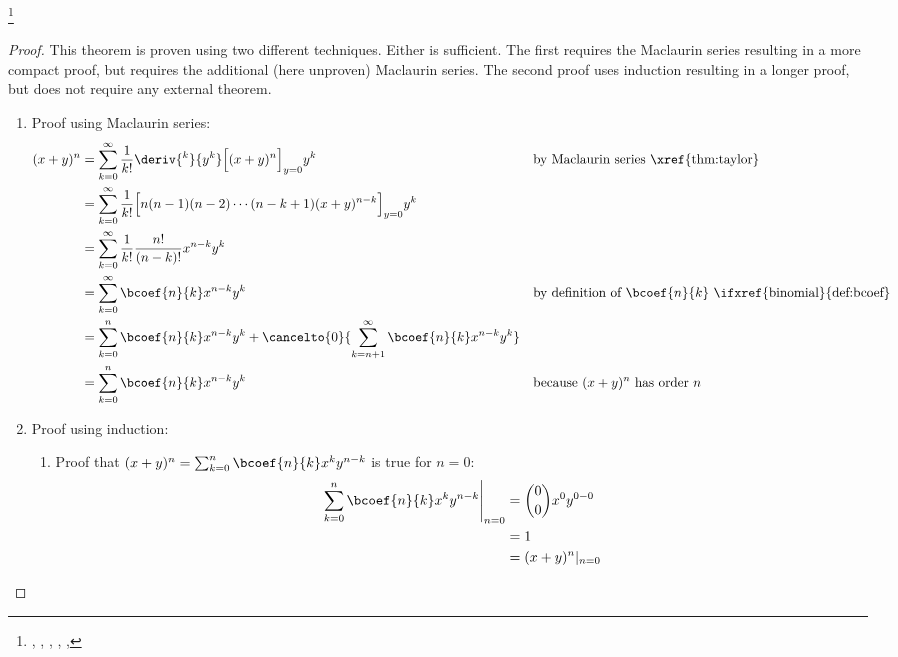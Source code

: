 \begin{theorem}
\footnote{
  ,
  ,
  ,
  ,
  ,
  }
\label{thm:binomial}
\end{theorem}
\begin{proof}
This theorem is proven using two different techniques.
Either is sufficient.
The first requires the Maclaurin series resulting in a more compact proof,
but requires the additional (here unproven) Maclaurin series.
The second proof uses induction resulting in a longer proof,
but does not require any external theorem.

\begin{enumerate}
\item Proof using Maclaurin series:
\begin{align*}
  (x+y)^n
    &= \sum_{k=0}^\infty \frac{1}{k!} \deriv{^k}{y^k}\Big[(x+y)^n\Big]_{y=0} y^k
    && \text{by Maclaurin series \xref{thm:taylor}}
  \\&= \sum_{k=0}^\infty \frac{1}{k!} \Big[n(n-1)(n-2)\cdots(n-k+1)(x+y)^{n-k}\Big]_{y=0} y^k
  \\&= \sum_{k=0}^\infty \frac{1}{k!} \frac{n!}{(n-k)!} x^{n-k} y^k
  \\&= \sum_{k=0}^\infty \bcoef{n}{k} x^{n-k} y^k
    && \text{by definition of $\bcoef{n}{k}$ \ifxref{binomial}{def:bcoef}}
  \\&= \sum_{k=0}^n \bcoef{n}{k} x^{n-k} y^k
      +\cancelto{0}{\sum_{k=n+1}^\infty \bcoef{n}{k} x^{n-k} y^k}
  \\&= \sum_{k=0}^n \bcoef{n}{k} x^{n-k} y^k
    && \text{because $(x+y)^n$ has order $n$}
\end{align*}

\item Proof using induction:
\begin{enumerate}
\item Proof that
  $(x+y)^{n} = \sum_{k=0}^{n} \bcoef{n}{k} x^k y^{n-k}$
  is true for $n=0$:
\begin{align*}
  \left.\sum_{k=0}^{n} \bcoef{n}{k} x^k y^{n-k} \right|_{n=0}
    &= \binom{0}{0} x^0 y^{0-0}
  \\&= 1
  \\&= (x+y)^n|_{n=0}
\end{align*}


\end{enumerate}
\end{enumerate}
\end{proof}
